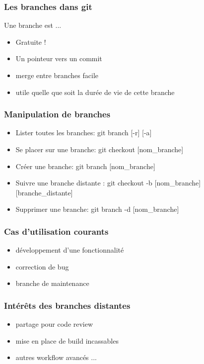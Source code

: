 \begin{frame}[fragile]\frametitle{Les branches dans git}
  Une branche est ...
  \begin{itemize}
  \item Gratuite !
  \item Un pointeur vers un commit
  \item merge entre branches facile
  \item utile quelle que soit la durée de vie de cette branche
  \end{itemize}

\end{frame}
\begin{frame}[fragile]\frametitle{Manipulation de branches}
  \begin{itemize}
  \item Lister toutes les branches: \alert{git branch [-r] [-a]}
  \item Se placer sur une branche: \alert{git checkout [nom\_branche]}
  \item Créer une branche: \alert{git branch [nom\_branche]}
  \item Suivre une branche distante : \alert{git checkout -b [nom\_branche]
  [branche\_distante]}
  \item Supprimer une branche: \alert{git branch -d [nom\_branche]}
  \end{itemize}

\end{frame}
\begin{frame}[fragile]\frametitle{Cas d'utilisation courants}
  \begin{itemize}
\item développement d'une fonctionnalité
\item correction de bug
\item branche de maintenance
  \end{itemize}
\end{frame}
\begin{frame}[fragile]\frametitle{Intérêts des branches distantes}
  \begin{itemize}
  \item partage pour code review
  \item mise en place de build incassables
  \item autres workflow avancés ...
  \end{itemize}
\end{frame}


